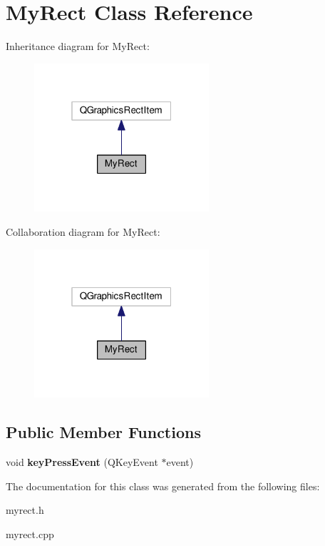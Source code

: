 \hypertarget{class_my_rect}{}\section{My\+Rect Class Reference}
\label{class_my_rect}


Inheritance diagram for My\+Rect\+:
\nopagebreak
\begin{figure}[H]
\begin{center}
\leavevmode
\includegraphics[width=184pt]{class_my_rect__inherit__graph}
\end{center}
\end{figure}


Collaboration diagram for My\+Rect\+:
\nopagebreak
\begin{figure}[H]
\begin{center}
\leavevmode
\includegraphics[width=184pt]{class_my_rect__coll__graph}
\end{center}
\end{figure}
\subsection*{Public Member Functions}
\begin{DoxyCompactItemize}
\item 
\mbox{\label{class_my_rect_a557cdd7d9e409375ba1c85be6adae367}} 
void {\bfseries key\+Press\+Event} (Q\+Key\+Event $\ast$event)
\end{DoxyCompactItemize}


The documentation for this class was generated from the following files\+:\begin{DoxyCompactItemize}
\item 
myrect.\+h\item 
myrect.\+cpp\end{DoxyCompactItemize}
